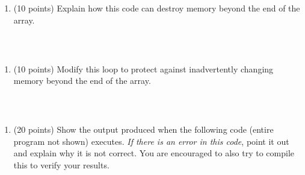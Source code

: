 \documentclass[
]{article}
\providecommand{\tightlist}{%
  \setlength{\itemsep}{0pt}\setlength{\parskip}{0pt}}
\begin{document}
\begin{enumerate}
\def\labelenumi{\alph{enumi}.}
\tightlist
\item
  (10 points) Explain how this code can destroy memory beyond the end of
  the array.
\end{enumerate}

\begin{verbatim}



\end{verbatim}

\begin{enumerate}
\def\labelenumi{\alph{enumi}.}
\setcounter{enumi}{1}
\tightlist
\item
  (10 points) Modify this loop to protect against inadvertently changing
  memory beyond the end of the array.
\end{enumerate}

\begin{verbatim}



\end{verbatim}

\begin{enumerate}
\def\labelenumi{\arabic{enumi}.}
\setcounter{enumi}{3}
\tightlist
\item
  (20 points) Show the output produced when the following code (entire
  program not shown) executes. \emph{If there is an error in this code},
  point it out and explain why it is not correct. You are encouraged to
  also try to compile this to verify your results.
\end{enumerate}
\end{document}
